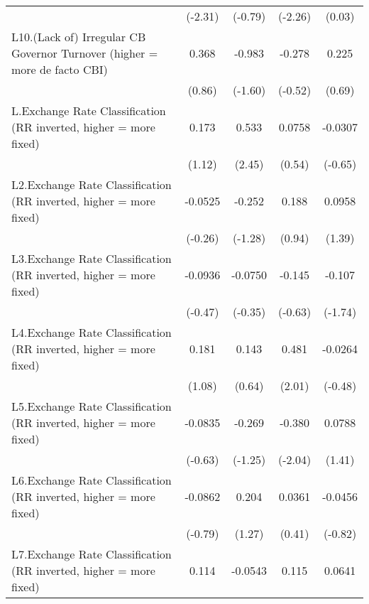 {\begin{longtable}{l*{4}{c}}
                &  (-2.31)         &  (-0.79)         &  (-2.26)         &   (0.03)         \\
[1em]
L10.(Lack of) Irregular CB Governor Turnover (higher = more de facto CBI)&    0.368         &   -0.983         &   -0.278         &    0.225         \\
                &   (0.86)         &  (-1.60)         &  (-0.52)         &   (0.69)         \\
[1em]
L.Exchange Rate Classification (RR inverted, higher = more fixed)&    0.173         &    0.533\sym{*}  &   0.0758         &  -0.0307         \\
                &   (1.12)         &   (2.45)         &   (0.54)         &  (-0.65)         \\
[1em]
L2.Exchange Rate Classification (RR inverted, higher = more fixed)&  -0.0525         &   -0.252         &    0.188         &   0.0958         \\
                &  (-0.26)         &  (-1.28)         &   (0.94)         &   (1.39)         \\
[1em]
L3.Exchange Rate Classification (RR inverted, higher = more fixed)&  -0.0936         &  -0.0750         &   -0.145         &   -0.107         \\
                &  (-0.47)         &  (-0.35)         &  (-0.63)         &  (-1.74)         \\
[1em]
L4.Exchange Rate Classification (RR inverted, higher = more fixed)&    0.181         &    0.143         &    0.481\sym{*}  &  -0.0264         \\
                &   (1.08)         &   (0.64)         &   (2.01)         &  (-0.48)         \\
[1em]
L5.Exchange Rate Classification (RR inverted, higher = more fixed)&  -0.0835         &   -0.269         &   -0.380\sym{*}  &   0.0788         \\
                &  (-0.63)         &  (-1.25)         &  (-2.04)         &   (1.41)         \\
[1em]
L6.Exchange Rate Classification (RR inverted, higher = more fixed)&  -0.0862         &    0.204         &   0.0361         &  -0.0456         \\
                &  (-0.79)         &   (1.27)         &   (0.41)         &  (-0.82)         \\
[1em]
L7.Exchange Rate Classification (RR inverted, higher = more fixed)&    0.114         &  -0.0543         &    0.115         &   0.0641         \\

\end{longtable}}
